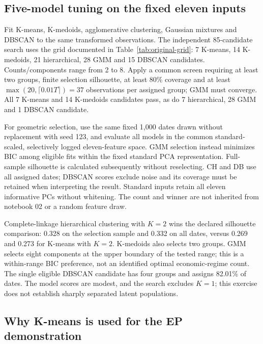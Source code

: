 \documentclass[11pt,a4paper]{article}
\begin{document}
\subsection{Five-model tuning on the fixed eleven inputs}

Fit K-means, K-medoids, agglomerative clustering, Gaussian mixtures and DBSCAN to the same transformed observations. The independent 85-candidate search uses the grid documented in Table~\ref{tab:original-grid}: 7 K-means, 14 K-medoids, 21 hierarchical, 28 GMM and 15 DBSCAN candidates. Counts/components range from 2 to 8. Apply a common screen requiring at least two groups, finite selection silhouette, at least 80\% coverage and at least $\max(20,\lceil0.01T\rceil)=37$ observations per assigned group; GMM must converge. All 7 K-means and 14 K-medoids candidates pass, as do 7 hierarchical, 28 GMM and 1 DBSCAN candidate.

For geometric selection, use the same fixed 1,000 dates drawn without replacement with seed 123, and evaluate all models in the common standard-scaled, selectively logged eleven-feature space. GMM selection instead minimizes BIC among eligible fits within the fixed standard PCA representation. Full-sample silhouette is calculated subsequently without reselecting. CH and DB use all assigned dates; DBSCAN scores exclude noise and its coverage must be retained when interpreting the result. Standard inputs retain all eleven informative PCs without whitening. The count and winner are not inherited from notebook 02 or a random feature draw.



Complete-linkage hierarchical clustering with $K=2$ wins the declared silhouette comparison: 0.328 on the selection sample and 0.332 on all dates, versus 0.269 and 0.273 for K-means with $K=2$. K-medoids also selects two groups. GMM selects eight components at the upper boundary of the tested range; this is a within-range BIC preference, not an identified optimal economic-regime count. The single eligible DBSCAN candidate has four groups and assigns 82.01\% of dates. The model scores are modest, and the search excludes $K=1$; this exercise does not establish sharply separated latent populations.

\subsection{Why K-means is used for the EP demonstration}
\label{sec:ep-choice}
\end{document}
